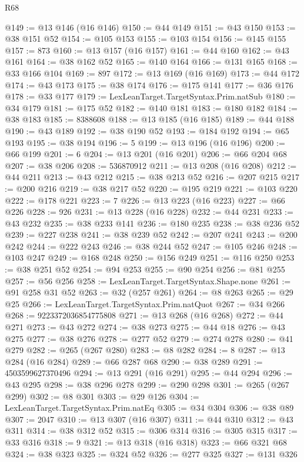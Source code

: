 \begin{lexlean}{R68}
\begin{coremodule}
@149 := @13 @146 (@16 @146)
@150 := @44 @149
@151 := @43 @150
@153 := @38 @151 @52
@154 := @105 @153
@155 := @103 @154
@156 := @145 @155
@157 := 873
@160 := @13 @157 (@16 @157)
@161 := @44 @160
@162 := @43 @161
@164 := @38 @162 @52
@165 := @140 @164
@166 := @131 @165
@168 := @33 @166 @104
@169 := 897
@172 := @13 @169 (@16 @169)
@173 := @44 @172
@174 := @43 @173
@175 := @38 @174
@176 := @175 @141
@177 := @36 @176
@178 := @33 @177
@179 := LexLeanTarget.TargetSyntax.Prim.natSub
@180 := @34 @179
@181 := @175 @52
@182 := @140 @181
@183 := @180 @182
@184 := @38 @183
@185 := 8388608
@188 := @13 @185 (@16 @185)
@189 := @44 @188
@190 := @43 @189
@192 := @38 @190 @52
@193 := @184 @192
@194 := @65 @193
@195 := @38 @194
@196 := 5
@199 := @13 @196 (@16 @196)
@200 := @66 @199
@201 := 6
@204 := @13 @201 (@16 @201)
@206 := @66 @204 @68
@207 := @38 @206
@208 := 536870912
@211 := @13 @208 (@16 @208)
@212 := @44 @211
@213 := @43 @212
@215 := @38 @213 @52
@216 := @207 @215
@217 := @200 @216
@219 := @38 @217 @52
@220 := @195 @219
@221 := @103 @220
@222 := @178 @221
@223 := 7
@226 := @13 @223 (@16 @223)
@227 := @66 @226
@228 := 926
@231 := @13 @228 (@16 @228)
@232 := @44 @231
@233 := @43 @232
@235 := @38 @233 @141
@236 := @180 @235
@238 := @38 @236 @52
@239 := @227 @238
@241 := @38 @239 @52
@242 := @207 @241
@243 := @200 @242
@244 := @222 @243
@246 := @38 @244 @52
@247 := @105 @246
@248 := @103 @247
@249 := @168 @248
@250 := @156 @249
@251 := @116 @250
@253 := @38 @251 @52
@254 := @94 @253
@255 := @90 @254
@256 := @81 @255
@257 := @56 @256
@258 := LexLeanTarget.TargetSyntax.Shape.none
@261 := @91 @258 @31 @52
@263 := @32 (@257 @261)
@264 := @8 @263
@265 := @29 @25
@266 := LexLeanTarget.TargetSyntax.Prim.natQuot
@267 := @34 @266
@268 := 9223372036854775808
@271 := @13 @268 (@16 @268)
@272 := @44 @271
@273 := @43 @272
@274 := @38 @273
@275 := @44 @18
@276 := @43 @275
@277 := @38 @276
@278 := @277 @52
@279 := @274 @278
@280 := @41 @279
@282 := @265 (@267 @280)
@283 := @8 @282
@284 := 8
@287 := @13 @284 (@16 @284)
@289 := @66 @287 @68
@290 := @38 @289
@291 := 4503599627370496
@294 := @13 @291 (@16 @291)
@295 := @44 @294
@296 := @43 @295
@298 := @38 @296 @278
@299 := @290 @298
@301 := @265 (@267 @299)
@302 := @8 @301
@303 := @29 @126
@304 := LexLeanTarget.TargetSyntax.Prim.natEq
@305 := @34 @304
@306 := @38 @89
@307 := 2047
@310 := @13 @307 (@16 @307)
@311 := @44 @310
@312 := @43 @311
@314 := @38 @312 @52
@315 := @306 @314
@316 := @305 @315
@317 := @33 @316
@318 := 9
@321 := @13 @318 (@16 @318)
@323 := @66 @321 @68
@324 := @38 @323
@325 := @324 @52
@326 := @277 @325
@327 := @131 @326

\end{coremodule}
\end{lexlean}
